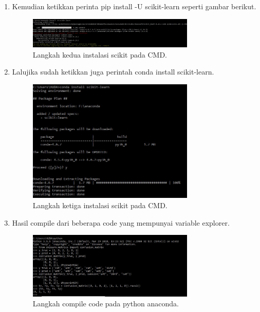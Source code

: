 \begin{enumerate}
\item Kemudian ketikkan perinta pip install -U scikit-learn seperti gambar berikut.
\begin{figure}[ht]\centerline{\includegraphics[width=0.75\textwidth]{figures/7.JPG}}\caption{Langkah kedua instalasi scikit pada CMD.}\end{figure}
\item Lalujika sudah  ketikkan juga perintah conda install scikit-learn.
\begin{figure}[ht]\centerline{\includegraphics[width=0.75\textwidth]{figures/8.JPG}}\caption{Langkah ketiga instalasi scikit pada CMD.}\end{figure}
\item Hasil compile dari beberapa code yang mempunyai variable explorer.
\begin{figure}[ht]\centerline{\includegraphics[width=0.75\textwidth]{figures/9.JPG}}\caption{Langkah compile code pada python anaconda.}\end{figure}
\end{enumerate}
